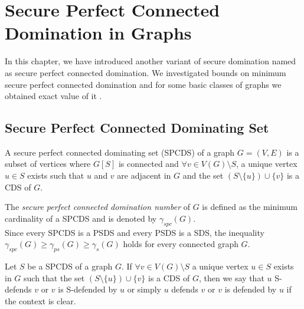 \chapter{Secure Perfect Connected Domination in Graphs}
\noindent
In this chapter, we have introduced another variant of secure domination named as secure perfect connected domination. We investigated bounds on minimum secure perfect connected domination and for some basic classes of graphs we obtained exact value of it . 
\section{Secure Perfect Connected Dominating Set}
\noindent
\begin{Definition}
A secure perfect connected dominating set (SPCDS) of a graph $G=(V,E)$ is a subset of vertices where $G[S]$ is connected and $\forall v \in V(G)\setminus S$, a unique vertex $u \in S$ exists such that $u$ and $v$ are adjacent in $G$ and the set $(S\setminus \lbrace u \rbrace) \cup \lbrace v \rbrace$ is a CDS of $G$.  
\end{Definition}
\noindent The \textit{secure perfect connected domination number} of $G$ is defined as the minimum cardinality of a SPCDS and is denoted by $\gamma_{spc}(G)$.\\
Since every SPCDS is a PSDS and every PSDS is a SDS, the inequality $\gamma_{spc}(G) \geq \gamma_{ps}(G) \geq \gamma_s(G)$ holds for every connected graph $G$.
\begin{Definition}
Let $S$ be a SPCDS of a graph $G$. If $\forall v \in V(G) \setminus S$ a unique vertex $u \in S$ exists in $G$ such that the set $(S\setminus \lbrace u \rbrace) \cup \lbrace v \rbrace$ is a CDS of $G$, then we say that $u$ S-defends $v$ or $v$ is S-defended by $u$ or simply $u$ defends $v$ or $v$ is defended by $u$ if the context is clear.
\end{Definition}
